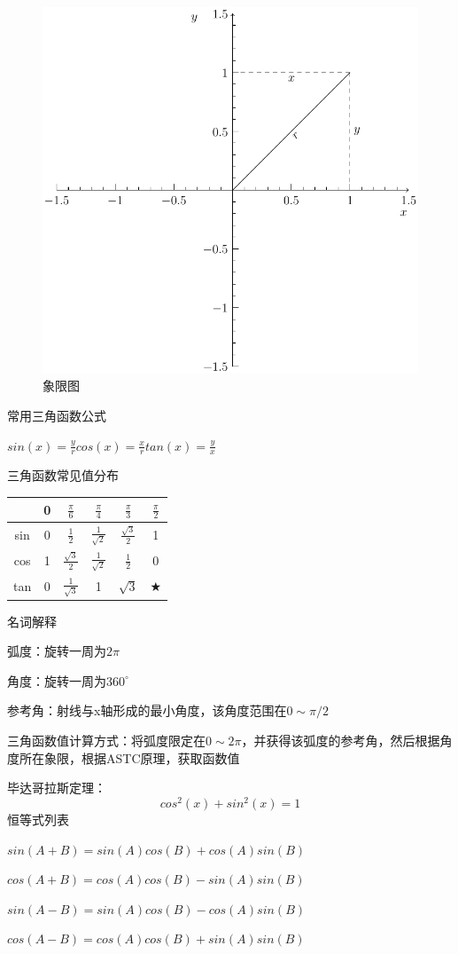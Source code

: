 \documentclass[UTF8,fontset=ubuntu]{ctexart}
\begin{document}
\begin{figure}[H]
	\centering
	\includegraphics[scale=0.4]{quadrantal.pdf}
	\caption{象限图}
\end{figure}
常用三角函数公式\par
$sin(x)=\frac{y}{r}$\qquad$cos(x)=\frac{x}{r}$\qquad$tan(x)=\frac{y}{x}$\par
三角函数常见值分布\par
\begin{table}[H]
\centering
\begin{tabular}{c|c c c c c}
	\hline
	& 0 & $\frac{\pi}{6}$ & $\frac{\pi}{4}$ & $\frac{\pi}{3}$ & $\frac{\pi}{2}$\\
	\hline
	sin & 0 & $\frac{1}{2}$ & $\frac{1}{\sqrt{2}}$ & $\frac{\sqrt{3}}{2}$ & 1\\
	cos & 1 & $\frac{\sqrt{3}}{2}$ & $\frac{1}{\sqrt{2}}$ & $\frac{1}{2}$ & 0\\
	tan & 0 & $\frac{1}{\sqrt{3}}$ & 1 & $\sqrt{3}$ & $\bigstar$\\
	\hline
\end{tabular}
\end{table}
名词解释\par
弧度：旋转一周为$2\pi$\par
角度：旋转一周为$360^\circ$\par
参考角：射线与x轴形成的最小角度，该角度范围在$0\sim\pi/2$\par
三角函数值计算方式：将弧度限定在$0\sim2\pi$，并获得该弧度的参考角，然后根据角度所在象限，根据ASTC原理，获取函数值\par
毕达哥拉斯定理：
\[cos^2(x)+sin^2(x)=1\]
恒等式列表\par
$sin(A+B)=sin(A)cos(B)+cos(A)sin(B)$\par
$cos(A+B)=cos(A)cos(B)-sin(A)sin(B)$\par
$sin(A-B)=sin(A)cos(B)-cos(A)sin(B)$\par
$cos(A-B)=cos(A)cos(B)+sin(A)sin(B)$\par
\end{document}
